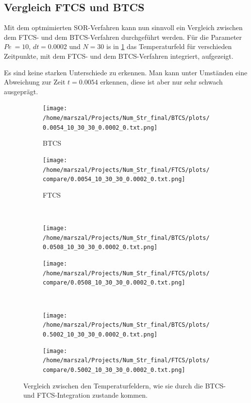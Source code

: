 \subsection{Vergleich FTCS und BTCS}
Mit dem optmimierten SOR-Verfahren kann nun sinnvoll ein Vergleich zwischen dem FTCS- und dem BTCS-Verfahren durchgeführt werden.
Für die Parameter $Pe~=10$, $dt=0.0002$ und $N=30$ is in \cref{fig:vergleich} das Temperaturfeld für verschieden Zeitpunkte, mit dem FTCS- und dem BTCS-Verfahren integriert, aufgezeigt.

Es sind keine starken Unterschiede zu erkennen. Man kann unter Umständen eine Abweichung zur Zeit $t=0.0054$ erkennen, diese ist aber nur sehr schwach ausgeprägt.

\begin{figure}
  \centering
  \begin{subfigure}[b]{0.5\textwidth}\caption{BTCS}
  \texttt{[image: /home/marszal/Projects/Num\_Str\_final/BTCS/plots/0.0054\_10\_30\_30\_0.0002\_0.txt.png]}
  \end{subfigure}
  \hspace{-0.5cm}
  \begin{subfigure}[b]{0.5\textwidth}\caption{FTCS}
  \texttt{[image: /home/marszal/Projects/Num\_Str\_final/FTCS/plots/compare/0.0054\_10\_30\_30\_0.0002\_0.txt.png]}
  \end{subfigure}
  \\
  \begin{subfigure}[b]{0.5\textwidth}
  \texttt{[image: /home/marszal/Projects/Num\_Str\_final/BTCS/plots/0.0508\_10\_30\_30\_0.0002\_0.txt.png]}
  \end{subfigure}
  \hspace{-0.5cm}
  \begin{subfigure}[b]{0.5\textwidth}
  \texttt{[image: /home/marszal/Projects/Num\_Str\_final/FTCS/plots/compare/0.0508\_10\_30\_30\_0.0002\_0.txt.png]}
  \end{subfigure}
  \\
  \begin{subfigure}[b]{0.5\textwidth}
  \texttt{[image: /home/marszal/Projects/Num\_Str\_final/BTCS/plots/0.5002\_10\_30\_30\_0.0002\_0.txt.png]}
  \end{subfigure}
  \hspace{-0.5cm}
  \begin{subfigure}[b]{0.5\textwidth}
  \texttt{[image: /home/marszal/Projects/Num\_Str\_final/FTCS/plots/compare/0.5002\_10\_30\_30\_0.0002\_0.txt.png]}
  \end{subfigure}
  \caption{Vergleich zwischen den Temperaturfeldern, wie sie durch die BTCS- und FTCS-Integration zustande kommen.}\label{fig:vergleich}
\end{figure}

